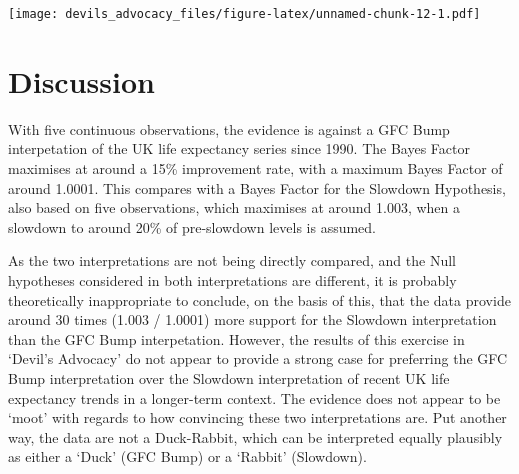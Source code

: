 \documentclass[]{article}
\begin{document}
\texttt{[image: devils\_advocacy\_files/figure-latex/unnamed-chunk-12-1.pdf]}

\section{Discussion}\label{discussion}

With five continuous observations, the evidence is against a GFC Bump
interpetation of the UK life expectancy series since 1990. The Bayes
Factor maximises at around a 15\% improvement rate, with a maximum Bayes
Factor of around 1.0001. This compares with a Bayes Factor for the
Slowdown Hypothesis, also based on five observations, which maximises at
around 1.003, when a slowdown to around 20\% of pre-slowdown levels is
assumed.

As the two interpretations are not being directly compared, and the Null
hypotheses considered in both interpretations are different, it is
probably theoretically inappropriate to conclude, on the basis of this,
that the data provide around 30 times (1.003 / 1.0001) more support for
the Slowdown interpretation than the GFC Bump interpetation. However,
the results of this exercise in `Devil's Advocacy' do not appear to
provide a strong case for preferring the GFC Bump interpretation over
the Slowdown interpretation of recent UK life expectancy trends in a
longer-term context. The evidence does not appear to be `moot' with
regards to how convincing these two interpretations are. Put another
way, the data are not a Duck-Rabbit, which can be interpreted equally
plausibly as either a `Duck' (GFC Bump) or a `Rabbit' (Slowdown).
\end{document}
